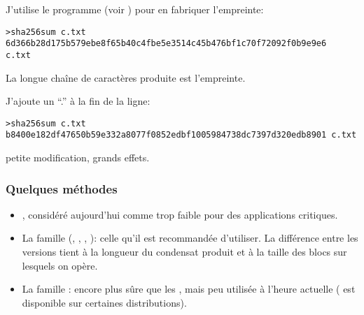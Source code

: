 
J'utilise le programme  (voir \cite{sha2}) pour en
fabriquer l'empreinte: 

\begin{verbatim}
>sha256sum c.txt
6d366b28d175b579ebe8f65b40c4fbe5e3514c45b476bf1c70f72092f0b9e9e6  c.txt
\end{verbatim}
La longue chaîne de caractères produite est l'empreinte.



J'ajoute un ``.'' à la fin de la ligne:



\begin{verbatim}
>sha256sum c.txt
b8400e182df47650b59e332a8077f0852edbf1005984738dc7397d320edb8901 c.txt
\end{verbatim}

petite modification, grands effets.

\subsubsection{Quelques méthodes}
\begin{itemize}
  \item {}, considéré aujourd'hui comme trop faible pour des
    applications critiques.
  \item La famille  (, ,
    , ): celle qu'il est recommandée
    d'utiliser. La différence entre les versions tient à la longueur
    du condensat produit et à la taille des blocs sur lesquels on
    opère.
    \item  La famille : encore plus sûre que  les
      , mais peu utilisée à l'heure actuelle
      ( est disponible sur certaines distributions).
\end{itemize}
